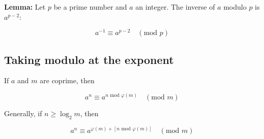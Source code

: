\textbf{Lemma:} Let $p$ be a prime number and $a$ an integer. The inverse of $a$ modulo $p$ is $a^{p-2}$:

$$a^{-1} \equiv a^{p-2} \quad (\text{mod } p)$$

\subsection{Taking modulo at the exponent}

If $a$ and $m$ are coprime, then

$$ a^n \equiv a^{n \text{ mod } \varphi(m)} \quad (\text{mod } m) $$

Generally, if $n \geq \log_2 m$, then

$$ a^n \equiv a^{\varphi(m) + [n \text{ mod } \varphi(m)]} \quad (\text{mod } m) $$

